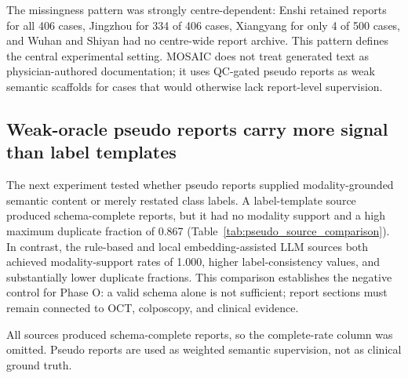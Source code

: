 The missingness pattern was strongly centre-dependent: Enshi retained reports for all 406 cases, Jingzhou for 334 of 406 cases, Xiangyang for only 4 of 500 cases, and Wuhan and Shiyan had no centre-wide report archive. This pattern defines the central experimental setting. MOSAIC does not treat generated text as physician-authored documentation; it uses QC-gated pseudo reports as weak semantic scaffolds for cases that would otherwise lack report-level supervision.

\FloatBarrier

\subsection{Weak-oracle pseudo reports carry more signal than label templates}
\label{subsec:pseudo_report_results}

The next experiment tested whether pseudo reports supplied modality-grounded semantic content or merely restated class labels. A label-template source produced schema-complete reports, but it had no modality support and a high maximum duplicate fraction of 0.867 (Table~\ref{tab:pseudo_source_comparison}). In contrast, the rule-based and local embedding-assisted LLM sources both achieved modality-support rates of 1.000, higher label-consistency values, and substantially lower duplicate fractions. This comparison establishes the negative control for Phase O: a valid schema alone is not sufficient; report sections must remain connected to OCT, colposcopy, and clinical evidence.

\begin{table}[!htbp]
  \centering
  \caption{Structured pseudo-report source comparison.}
  \label{tab:pseudo_source_comparison}
  \scriptsize
  \begin{threeparttable}
  \begin{tablenotes}[flushleft]
    \footnotesize
    \item All sources produced schema-complete reports, so the complete-rate column was omitted. Pseudo reports are used as weighted semantic supervision, not as clinical ground truth.
  \end{tablenotes}
  \end{threeparttable}
\end{table}

